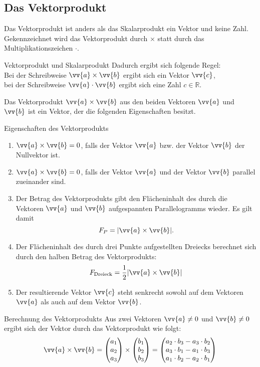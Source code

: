 \subsection{Das Vektorprodukt}
Das Vektorprodukt ist anders als das Skalarprodukt ein Vektor und keine Zahl. Gekennzeichnet wird das Vektorprodukt durch $\times$ statt durch das Multiplikationszeichen $\cdot$. \\
\begin{b8d*}{Vektorprodukt und Skalarprodukt}{}
Dadurch ergibt sich folgende Regel:\\
Bei der Schreibweise $\vv{a} \times\vv{b}$ ergibt sich ein Vektor $\vv{c}$,\\
bei der Schreibweise $\vv{a} \cdot \vv{b}$ ergibt sich eine Zahl $c\in \mathds{R}$.
\end{b8d*}
Das Vektorprodukt $\vv{a} \times \vv{b}$ aus den beiden Vektoren $\vv{a}$ und $\vv{b}$ ist ein Vektor, der die folgenden Eigenschaften besitzt.
\begin{merke}{Eigenschaften des Vektorprodukts}{}
   \begin{enumerate}
       \item $\vv{a} \times \vv{b} = 0$, falls der Vektor $\vv{a}$ bzw. der Vektor $\vv{b}$ der Nullvektor ist.
       \item $\vv{a} \times \vv{b} = 0$, falls der Vektor $\vv{a}$ und der Vektor $\vv{b}$ parallel zueinander sind.
       \item Der Betrag des Vektorprodukts gibt den Flächeninhalt des durch die Vektoren $\vv{a} $ und $\vv{b}$ aufgespannten Parallelogramms wieder. Es gilt damit $$F_P=|\vv{a} \times \vv{b} |.$$
       \item Der Flächeninhalt des durch drei Punkte aufgestellten Dreiecks berechnet sich durch den halben Betrag des Vektorprodukts: $$F_{\text{Dreieck}} = \dfrac{1}{2} |\vv{a} \times \vv{b}|$$
       \item Der resultierende Vektor $\vv{c} $ steht senkrecht sowohl auf dem Vektoren $\vv{a} $ als auch auf dem Vektor $\vv{b}$.
   \end{enumerate} 
\end{merke}
\begin{defi*}{Berechnung des Vektorprodukts}{}
Aus zwei Vektoren $\vv{a}\neq 0$ und $\vv{b} \neq 0$ ergibt sich der Vektor durch das Vektorprodukt wie folgt: $$\vv{a} \times \vv{b} = \begin{pmatrix} a_1 \\a_2\\a_3\end{pmatrix} \times \begin{pmatrix} b_1 \\b_2\\b_3\end{pmatrix} = \begin{pmatrix} a_2\cdot b_3 - a_3\cdot b_2 \\a_3\cdot b_1 - a_1\cdot b_3\\a_1\cdot b_2 - a_2\cdot b_1\end{pmatrix}$$
\end{defi*}

